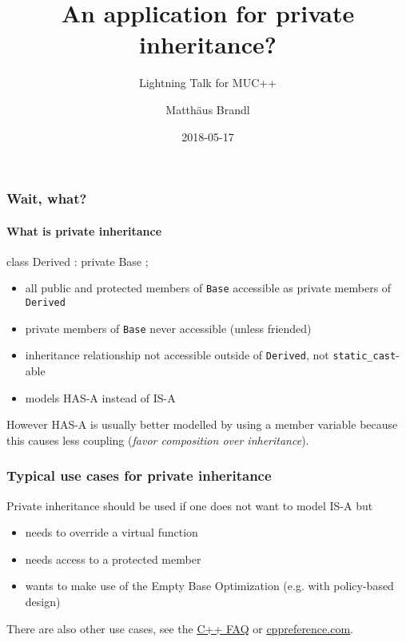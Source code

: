 \documentclass{beamer}
\title{An application for private inheritance?}
\subtitle{Lightning Talk for MUC++}
\author{Matth\"aus Brandl}
\date{2018-05-17}
\def\code#1{\texttt{#1}}
\def\link#1#2{\href{#1}{\usebeamercolor[fg]{structure} \underline{#2}}}
\begin{document}

\frame{\titlepage}


\begin{frame}[fragile]
\frametitle{Wait, what?}
\framesubtitle{What is private inheritance}

\begin{C++}
class Derived : private Base
{};
\end{C++}

\begin{itemize}
\item all public and protected members of \code{Base} accessible as private members of \code{Derived}
\item private members of \code{Base} never accessible (unless friended)
\pause 
\item inheritance relationship not accessible outside of \code{Derived}, not \code{static\_cast}-able
\pause
\item models HAS-A instead of IS-A
\end{itemize}
\pause

However HAS-A is usually better modelled by using a member variable because this causes less coupling (\textit{favor composition over inheritance}).
\end{frame}


\begin{frame}[fragile]
\frametitle{Typical use cases for private inheritance}
Private inheritance should be used if one does not want to model IS-A but
\begin{itemize}
\item needs to override a virtual function
\pause
\item needs access to a protected member
\pause
\item wants to make use of the Empty Base Optimization (e.g. with policy-based design)
\end{itemize}
\pause
There are also other use cases, see the \link{https://isocpp.org/wiki/faq/private-inheritance}{C++ FAQ} or \link{https://en.cppreference.com/w/cpp/language/derived_class\#Private_inheritance}{cppreference.com}.
\end{frame}

\end{document}
